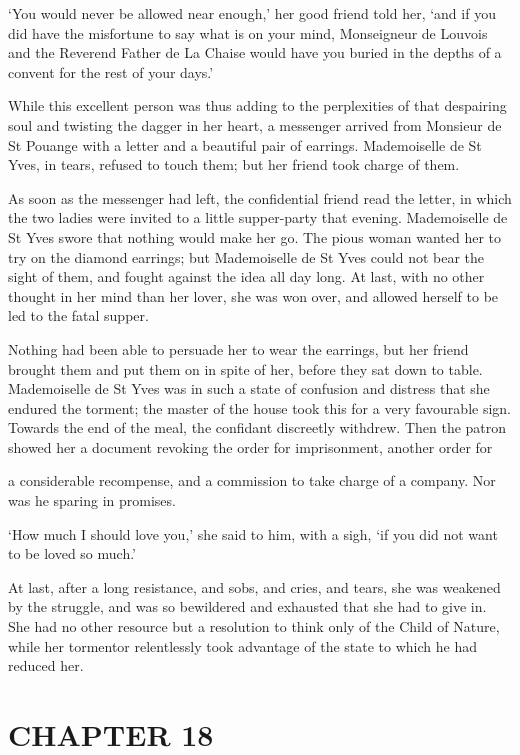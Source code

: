 \documentclass{article}
\begin{document}
\begin{center}
`You would never be allowed near enough,' her good friend told her, `and if you 
did have the misfortune to say what is on your mind, Monseigneur de Louvois and 
the Reverend Father de La Chaise would have you buried in the depths of a convent 
for the rest of your days.' 

While this excellent person was thus adding to the perplexities of that despairing 
soul and twisting the dagger in her heart, a messenger arrived from Monsieur de 
St Pouange with a letter and a beautiful pair of earrings. Mademoiselle de St Yves, 
in tears, refused to touch them; but her friend took charge of them. 

As soon as the messenger had left, the confidential friend read the letter, in 
which the two ladies were invited to a little supper-party that evening. Mademoiselle 
de St Yves swore that nothing would make her go. The pious woman wanted her to 
try on the diamond earrings; but Mademoiselle de St Yves could not bear the sight 
of them, and fought against the idea all day long. At last, with no other thought 
in her mind than her lover, she was won over, and allowed herself to be led to 
the fatal supper. 

Nothing had been able to persuade her to wear the earrings, but her friend brought 
them and put them on in spite of her, before they sat down to table. Mademoiselle 
de St Yves was in such a state of confusion and distress that she endured the torment; 
the master of the house took this for a very favourable sign. Towards the end of 
the meal, the confidant discreetly withdrew. Then the patron showed her a document 
revoking the order for imprisonment, another order for 

a considerable recompense, and a commission to take charge of a company. Nor was 
he sparing in promises. 

`How much I should love you,' she said to him, with a sigh, `if you did not want 
to be loved so much.' 

At last, after a long resistance, and sobs, and cries, and tears, she was weakened 
by the struggle, and was so bewildered and exhausted that she had to give in. She 
had no other resource but a resolution to think only of the Child of Nature, while 
her tormentor relentlessly took advantage of the state to which he had reduced 
her.\pagebreak{} 

\section*{\textbf{CHAPTER 18 }}


\end{center}
\end{document}
